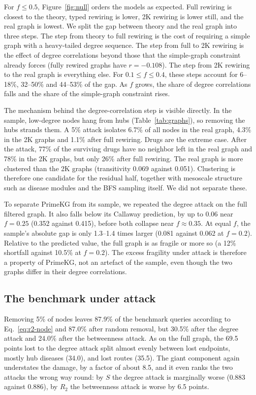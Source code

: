 For $f\le0.5$, Figure~\ref{fig:null} orders the models as expected. Full
rewiring is closest to the theory, typed rewiring is lower, 2K rewiring is lower
still, and the real graph is lowest. We split the gap between theory and the real graph into three
steps. The step from theory to full rewiring is the cost of requiring a simple
graph with a heavy-tailed degree sequence. The step from full to 2K rewiring is
the effect of degree correlations beyond those that the simple-graph constraint
already forces (fully rewired graphs have $r=-0.108$). The step from 2K rewiring to the real graph
is everything else. For $0.1\le f\le0.4$, these steps account for 6--18\%,
32--50\% and 44--53\% of the gap. As $f$ grows, the share of degree correlations
falls and the share of the simple-graph constraint rises.

The mechanism behind the degree-correlation step is visible directly. In the
sample, low-degree nodes hang from hubs (Table~\ref{tab:graphs}), so removing
the hubs strands them. A 5\% attack isolates 6.7\% of all nodes in the real
graph, 4.3\% in the 2K graphs and 1.1\% after full rewiring. Drugs are the
extreme case. After the attack, 77\% of the surviving drugs have no neighbor
left in the real graph and 78\% in the 2K graphs, but only 26\% after full
rewiring. The real graph is more clustered than
the 2K graphs (transitivity 0.069 against 0.051). Clustering is therefore one
candidate for the residual half, together with mesoscale structure such as
disease modules and the BFS sampling itself. We did not separate these.

To separate PrimeKG from its sample, we repeated the degree attack on the full
filtered graph. It also falls below its Callaway prediction, by up to 0.06 near
$f=0.25$ (0.352 against 0.415), before both collapse near $f\approx0.35$. At equal
$f$, the sample's absolute gap is only 1.3--1.4 times larger (0.081 against
0.062 at $f=0.2$). Relative to the predicted value, the full graph is as fragile
or more so (a 12\% shortfall against 10.5\% at $f=0.2$). The excess fragility
under attack is therefore a property of PrimeKG, not an artefact of the sample,
even though the two graphs differ in their degree correlations.

\subsection{The benchmark under attack}
\label{sec:hubs-sample}

Removing 5\% of nodes leaves 87.9\% of the benchmark queries according to
Eq.~\eqref{eq:r2-node} and 87.0\% after random removal, but 30.5\% after the
degree attack and 24.0\% after the betweenness attack. As on the full graph,
the 69.5 points lost to the degree attack split almost evenly between lost
endpoints, mostly hub diseases (34.0), and lost routes (35.5). The giant
component again understates the damage, by a factor of about 8.5, and it even
ranks the two attacks the wrong way round: by $S$ the degree attack is
marginally worse (0.883 against 0.886), by $R_2$ the betweenness attack is worse
by 6.5 points.
